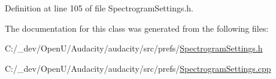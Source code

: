 Definition at line 105 of file Spectrogram\+Settings.\+h.



The documentation for this class was generated from the following files\+:\begin{DoxyCompactItemize}
\item 
C\+:/\+\_\+dev/\+Open\+U/\+Audacity/audacity/src/prefs/\hyperlink{_spectrogram_settings_8h}{Spectrogram\+Settings.\+h}\item 
C\+:/\+\_\+dev/\+Open\+U/\+Audacity/audacity/src/prefs/\hyperlink{_spectrogram_settings_8cpp}{Spectrogram\+Settings.\+cpp}\end{DoxyCompactItemize}
